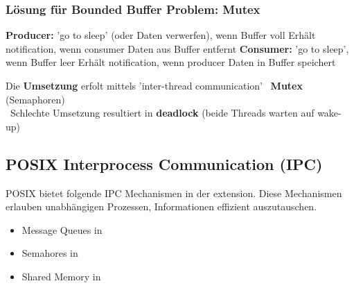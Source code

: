\subsubsection{Lösung für Bounded Buffer Problem: Mutex}

\begin{outline}
    \1 \textbf{Producer:} 'go to sleep' (oder Daten verwerfen), wenn Buffer voll
        \2 Erhält notification, wenn consumer Daten aus Buffer entfernt
    \1 \textbf{Consumer:} 'go to sleep', wenn Buffer leer
        \2 Erhält notification, wenn producer Daten in Buffer speichert
\end{outline}

\vspace{0.1cm}

Die \textbf{Umsetzung} erfolt mittels 'inter-thread communication' \textrightarrow\ \textbf{Mutex} (Semaphoren) \\
\textrightarrow\ Schlechte Umsetzung resultiert in \textbf{deadlock} (beide Threads warten auf wake-up)


\subsection{POSIX Interprocess Communication (IPC)}

POSIX bietet folgende IPC Mechanismen in der  extension.
Diese Mechanismen erlauben unabhängigen Prozessen, Informationen effizient auszutauschen.

\vspace{0.1cm}

\begin{minipage}[t]{0.48\columnwidth}
    \raggedright
    \begin{itemize}
        \item Message Queues in 
        \item Semahores in 
    \end{itemize}
\end{minipage}
\hfill
\begin{minipage}[t]{0.48\columnwidth}
    \raggedright
    \begin{itemize}
        \item Shared Memory in 
    \end{itemize}
\end{minipage}

